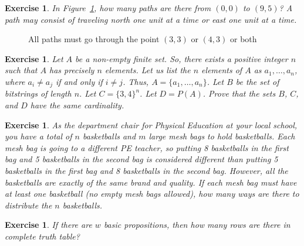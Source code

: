 \documentclass{book}
\newcounter{ekcounter}%
\theoremstyle{ekimcustom}
\newtheorem{exercise}[ekcounter]{Exercise}
\begin{document}
\begin{exercise}
In Figure~\ref{figure:paths-through-bottleneck}, how many paths are there from $(0,0)$ to $(9,5)$? A path may consist of traveling north one unit at a time or east one unit at a time.
\end{exercise}
\begin{figure}[hbt] %
\begin{center}
\caption{All paths must go through the point $(3,3)$ or $(4,3)$ or both}\label{figure:paths-through-bottleneck}
\end{center}
\end{figure}

\begin{exercise}
Let $A$ be a non-empty finite set. So, there exists a positive integer $n$ such that $A$ has precisely $n$ elements. Let us list the $n$ elements of $A$ as $a_1,\dots,a_n$, where $a_i \not= a_j$ if and only if $i \not= j$. Thus, $A=\{a_1,\dots,a_n\}$. Let $B$ be the set of bitstrings of length $n$. Let $C=\{3,4\}^n$. Let $D=P(A)$. Prove that the sets $B$, $C$, and $D$ have the same cardinality.
\end{exercise}

\begin{exercise}
As the department chair for Physical Education at your local school, you have a total of $n$ basketballs and $m$ large mesh bags to hold basketballs. Each mesh bag is going to a different PE teacher, so putting 8 basketballs in the first bag and 5 basketballs in the second bag is considered different than putting 5 basketballs in the first bag and 8 basketballs in the second bag. However, all the basketballs are exactly of the same brand and quality. If each mesh bag must have at least one basketball (no empty mesh bags allowed), how many ways are there to distribute the $n$ basketballs.
\end{exercise}

\begin{exercise}
If there are $w$ basic propositions, then how many rows are there in complete truth table?
\end{exercise}
\end{document}
